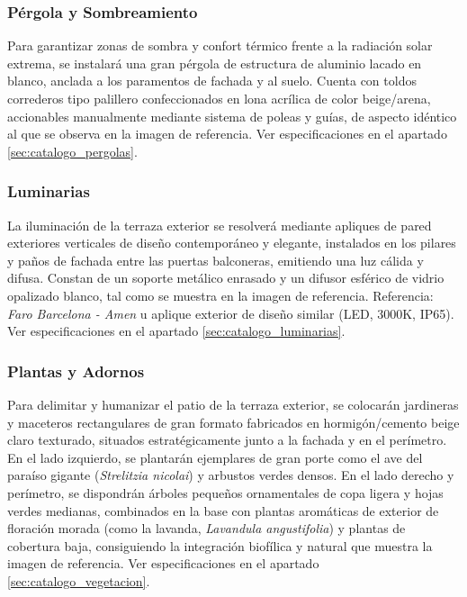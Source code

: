 \documentclass[12pt,a4paper]{article}
\begin{document}
\subsubsection{Pérgola y Sombreamiento}
Para garantizar zonas de sombra y confort térmico frente a la radiación solar extrema, se instalará una gran pérgola de estructura de aluminio lacado en blanco, anclada a los paramentos de fachada y al suelo. Cuenta con toldos correderos tipo palillero confeccionados en lona acrílica de color beige/arena, accionables manualmente mediante sistema de poleas y guías, de aspecto idéntico al que se observa en la imagen de referencia. Ver especificaciones en el apartado \ref{sec:catalogo_pergolas}.

\subsubsection{Luminarias}
La iluminación de la terraza exterior se resolverá mediante apliques de pared exteriores verticales de diseño contemporáneo y elegante, instalados en los pilares y paños de fachada entre las puertas balconeras, emitiendo una luz cálida y difusa. Constan de un soporte metálico enrasado y un difusor esférico de vidrio opalizado blanco, tal como se muestra en la imagen de referencia. Referencia: \textit{Faro Barcelona - Amen} u aplique exterior de diseño similar (LED, 3000K, IP65). Ver especificaciones en el apartado \ref{sec:catalogo_luminarias}.

\subsubsection{Plantas y Adornos}
Para delimitar y humanizar el patio de la terraza exterior, se colocarán jardineras y maceteros rectangulares de gran formato fabricados en hormigón/cemento beige claro texturado, situados estratégicamente junto a la fachada y en el perímetro. En el lado izquierdo, se plantarán ejemplares de gran porte como el ave del paraíso gigante (\textit{Strelitzia nicolai}) y arbustos verdes densos. En el lado derecho y perímetro, se dispondrán árboles pequeños ornamentales de copa ligera y hojas verdes medianas, combinados en la base con plantas aromáticas de exterior de floración morada (como la lavanda, \textit{Lavandula angustifolia}) y plantas de cobertura baja, consiguiendo la integración biofílica y natural que muestra la imagen de referencia. Ver especificaciones en el apartado \ref{sec:catalogo_vegetacion}.


\end{document}
